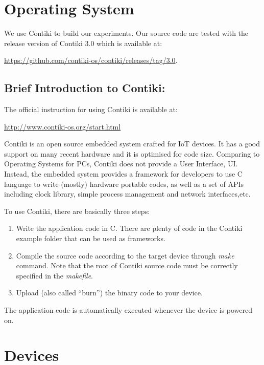 \section{Operating System}

We use Contiki\cite{Contiki} to build our experiments.  Our source code are tested  with the release version of Contiki 3.0 which is available at:

\begin{center}
	\url{https://github.com/contiki-os/contiki/releases/tag/3.0}.
\end{center}

\subsection{Brief Introduction to Contiki:}

The official instruction for using Contiki is available at:
\begin{center}
	\url{http://www.contiki-os.org/start.html}
\end{center}

Contiki is an open source embedded system crafted for IoT devices. It has a good support on many recent hardware and it is optimised for code size. Comparing to Operating Systems for PCs, Contiki does not provide a User Interface, UI. Instead, the embedded system provides a framework for developers to use C language to write (mostly) hardware portable codes, as well as a set of APIs including clock library, simple process management and network interfaces,etc.

To use Contiki, there are basically three steps:

\begin{enumerate}
	\item Write the application code in C. There are plenty of code in the Contiki example folder that can be used as frameworks.
	\item Compile the source code according to the target device through \textit{make} command. Note that the root of Contiki source code must be correctly specified in the \textit{makefile}.
	\item Upload (also called ``burn'') the binary code to your device. 
\end{enumerate}

The application code is automatically executed whenever the device is powered on.

\section{Devices}

